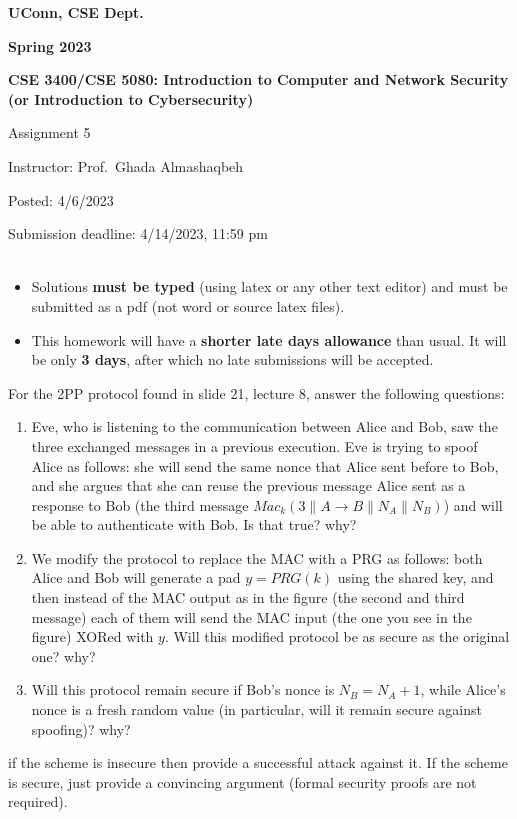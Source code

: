 \documentclass[12pt]{article}
\newcommand*\concat{\mathbin{\|}}
\newcommand{\handout}[2]{
\renewcommand{\thepage}{\footnotesize CSE 3400/CSE 5850, #1, p. \arabic{page}}
\begin{center}

\noindent
{\bf UConn, CSE Dept.}

\noindent
{\bf Spring 2023}

\noindent
{\bf CSE 3400/CSE 5080: Introduction to Computer and Network Security \\(or Introduction to Cybersecurity)}
\end{center}

\begin{center}
{\Large #1}
\end{center}
}
\begin{document}
\handout{Assignment 5}{}

\noindent
{Instructor: Prof.~Ghada Almashaqbeh}

\noindent
{Posted: 4/6/2023}

\noindent
{Submission deadline: 4/14/2023, 11:59 pm} \\\\

\begin{itemize}
\item Solutions {\bf must be typed} (using latex or any other text editor) and must be submitted as a pdf (not word or source latex files).

\item This homework will have a \textbf{shorter late days allowance} than usual. It will be only \textbf{3 days}, after which no late submissions will be accepted.
\end{itemize}


For the 2PP protocol found in slide 21, lecture 8, answer the following questions:
\begin{enumerate}
    \item Eve, who is listening to the communication between Alice and Bob, saw the three exchanged messages in a previous execution. Eve is trying to spoof Alice as follows: she will send the same nonce that Alice sent before to Bob, and she argues that she can reuse the previous message Alice sent as a response to Bob (the third message $Mac_k(3 \concat A \rightarrow B \concat N_A \concat N_B)$) and will be able to authenticate with Bob. Is that true? why?
    
    \item We modify the protocol to replace the MAC with a PRG as follows: both Alice and Bob will generate a pad $y = PRG(k)$ using the shared key, and then instead of the MAC output as in the figure (the second and third message) each of them will send the MAC input (the one you see in the figure) XORed with $y$. Will this modified protocol be as secure as the original one? why?
    
    \item Will this protocol remain secure if Bob's nonce is $N_B = N_A +1$, while Alice's nonce is a fresh random value (in particular, will it remain secure against spoofing)? why? 
\end{enumerate}


 if the scheme is insecure then provide a successful attack against it. If the scheme is secure, just provide a convincing argument (formal security proofs are not required).\\
\end{document}
